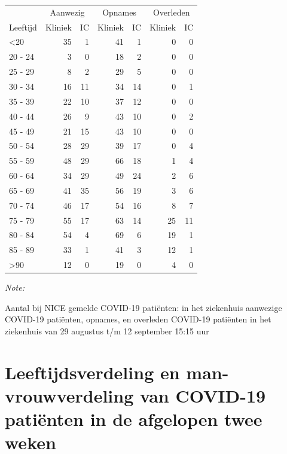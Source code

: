 \documentclass[
  english,
  man,floatsintext]{apa6}
\begin{document}
\begin{table}
\centering\begingroup\fontsize{10}{12}\selectfont

\begin{threeparttable}
\begin{tabular}{lrrrrrr}
\toprule
\multicolumn{1}{c}{ } & \multicolumn{2}{c}{Aanwezig} & \multicolumn{2}{c}{Opnames} & \multicolumn{2}{c}{Overleden} \\
\cmidrule(l{3pt}r{3pt}){2-3} \cmidrule(l{3pt}r{3pt}){4-5} \cmidrule(l{3pt}r{3pt}){6-7}
Leeftijd & Kliniek & IC & Kliniek & IC & Kliniek & IC\\
\midrule
<20 & 35 & 1 & 41 & 1 & 0 & 0\\
20 - 24 & 3 & 0 & 18 & 2 & 0 & 0\\
25 - 29 & 8 & 2 & 29 & 5 & 0 & 0\\
30 - 34 & 16 & 11 & 34 & 14 & 0 & 1\\
35 - 39 & 22 & 10 & 37 & 12 & 0 & 0\\
40 - 44 & 26 & 9 & 43 & 10 & 0 & 2\\
45 - 49 & 21 & 15 & 43 & 10 & 0 & 0\\
50 - 54 & 28 & 29 & 39 & 17 & 0 & 4\\
55 - 59 & 48 & 29 & 66 & 18 & 1 & 4\\
60 - 64 & 34 & 29 & 49 & 24 & 2 & 6\\
65 - 69 & 41 & 35 & 56 & 19 & 3 & 6\\
70 - 74 & 46 & 17 & 54 & 16 & 8 & 7\\
75 - 79 & 55 & 17 & 63 & 14 & 25 & 11\\
80 - 84 & 54 & 4 & 69 & 6 & 19 & 1\\
85 - 89 & 33 & 1 & 41 & 3 & 12 & 1\\
>90 & 12 & 0 & 19 & 0 & 4 & 0\\
\bottomrule
\end{tabular}
\begin{tablenotes}
\item \textit{Note: } 
\item Aantal bij NICE gemelde COVID-19 patiënten: in het ziekenhuis aanwezige COVID-19 patiënten, opnames, en overleden COVID-19 patiënten in het ziekenhuis van 29 augustus t/m 12 september 15:15 uur
\end{tablenotes}
\end{threeparttable}
\endgroup{}
\end{table}

\newpage

\hypertarget{leeftijdsverdeling-en-man-vrouwverdeling-van-covid-19-patiuxebnten-in-de-afgelopen-twee-weken}{%
\section{Leeftijdsverdeling en man-vrouwverdeling van COVID-19 patiënten in de afgelopen twee weken}\label{leeftijdsverdeling-en-man-vrouwverdeling-van-covid-19-patiuxebnten-in-de-afgelopen-twee-weken}}
\end{document}

